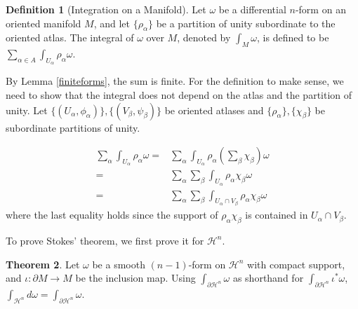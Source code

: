 \documentclass[]{article}
\theoremstyle{definition}
\newtheorem{theorem}{Theorem}[section] %
\theoremstyle{definition}
\newtheorem{definition}[theorem]{Definition} %
\begin{document}
\begin{definition}[Integration on a Manifold]
    Let $\omega$ be a differential $n$-form on an oriented manifold $M$, and let $\{\rho_\alpha\}$ be a partition of unity subordinate to the oriented atlas. The integral of $\omega$ over $M$, denoted by $\int_M \omega$, is defined to be $\sum_{\alpha\in A}\int_{U_\alpha}\rho_\alpha\omega$.
\end{definition}

By Lemma \ref{finiteforms}, the sum is finite. For the definition to make sense, we need to show that the integral does not depend on the atlas and the partition of unity. Let $\{(U_\alpha, \phi_\alpha)\},\{(V_\beta, \psi_\beta)\}$ be oriented atlases and $\{\rho_\alpha\},\{\chi_\beta\}$ be subordinate partitions of unity.

\begin{align*}
    \sum_{\alpha}\int_{U_\alpha}\rho_\alpha\omega
    =&\sum_{\alpha}\int_{U_\alpha}\rho_\alpha(\sum_\beta\chi_\beta)\omega\\
    =&\sum_{\alpha}\sum_\beta\int_{U_\alpha}\rho_\alpha\chi_\beta\omega\\
    =&\sum_{\alpha}\sum_\beta\int_{U_\alpha\cap V_\beta}\rho_\alpha\chi_\beta\omega
\end{align*}
where the last equality holds since the support of $\rho_\alpha\chi_\beta$ is contained in $U_\alpha\cap V_\beta$.

To prove Stokes' theorem, we first prove it for $\mathcal{H}^n$.

\begin{theorem}
    Let $\omega$ be a smooth $(n-1)$-form on $\mathcal{H}^n$ with compact support, and $\iota:\partial M \rightarrow M$ be the inclusion map. Using $\int_{\partial \mathcal{H}^n}\omega$ as shorthand for $\int_{\partial \mathcal{H}^n}\iota^*\omega$, $\int_{\mathcal{H}^n}d\omega=\int_{\partial \mathcal{H}^n}\omega$.
\end{theorem}
\end{document}
